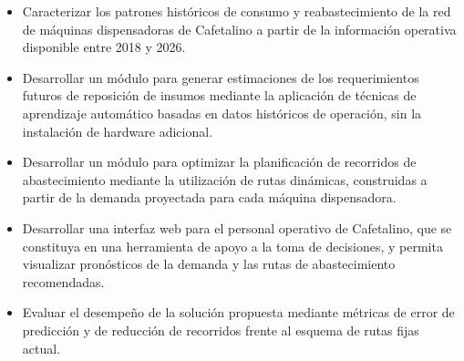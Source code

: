 \begin{itemize}
\item
  Caracterizar los patrones históricos de consumo y reabastecimiento de la red de máquinas dispensadoras de Cafetalino a partir de la información operativa disponible entre 2018 y 2026.
\item
  Desarrollar un módulo para generar estimaciones de los requerimientos futuros de reposición de insumos mediante la aplicación de técnicas de aprendizaje automático basadas en datos históricos de operación, sin la instalación de hardware adicional.
\item
  Desarrollar un módulo para optimizar la planificación de recorridos de abastecimiento mediante la utilización de rutas dinámicas, construidas a partir de la demanda proyectada para cada máquina dispensadora.
\item
  Desarrollar una interfaz web para el personal operativo de Cafetalino, que se constituya en una herramienta de apoyo a la toma de decisiones, y permita visualizar pronósticos de la demanda y las rutas de abastecimiento recomendadas.
\item
  Evaluar el desempeño de la solución propuesta mediante métricas de error de predicción y de reducción de recorridos frente al esquema de rutas fijas actual.
\end{itemize}
